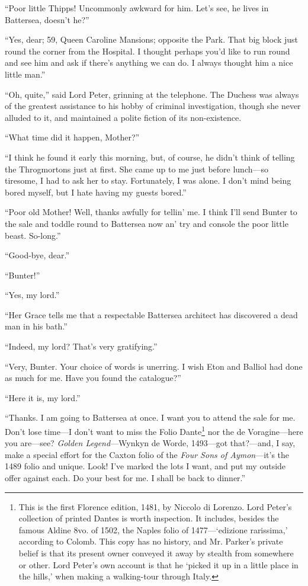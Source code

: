 \enquote{Poor little Thipps! Uncommonly awkward for him. Let’s see, he lives in Battersea, doesn’t he?}

\enquote{Yes, dear; 59, Queen Caroline Mansions; opposite the Park. That big block just round the corner from the Hospital. I thought perhaps you’d like to run round and see him and ask if there’s anything we can do. I always thought him a nice little man.}

\enquote{Oh, quite,} said Lord Peter, grinning at the telephone. The Duchess was always of the greatest assistance to his hobby of criminal investigation, though she never alluded to it, and maintained a polite fiction of its non-existence.

\enquote{What time did it happen, Mother?}

\enquote{I think he found it early this morning, but, of course, he didn’t think of telling the Throgmortons just at first. She came up to me just before lunch\allowbreak---\allowbreak so tiresome, I had to ask her to stay. Fortunately, I was alone. I don’t mind being bored myself, but I hate having my guests bored.}

\enquote{Poor old Mother! Well, thanks awfully for tellin’ me. I think I’ll send Bunter to the sale and toddle round to Battersea now an’ try and console the poor little beast. So-long.}

\enquote{Good-bye, dear.}

\enquote{Bunter!}

\enquote{Yes, my lord.}

\enquote{Her Grace tells me that a respectable Battersea architect has discovered a dead man in his bath.}

\enquote{Indeed, my lord? That’s very gratifying.}

\enquote{Very, Bunter. Your choice of words is unerring. I wish Eton and Balliol had done as much for me. Have you found the catalogue?}

\enquote{Here it is, my lord.}

\enquote{Thanks. I am going to Battersea at once. I want you to attend the sale for me. Don’t lose time\allowbreak---\allowbreak I don’t want to miss the Folio Dante\footnote{This is the first Florence edition, 1481, by Niccolo di Lorenzo. Lord Peter’s collection of printed Dantes is worth inspection. It includes, besides the famous Aldine 8vo. of 1502, the Naples folio of 1477—\enquote{edizione rarissima,} according to Colomb. This copy has no history, and Mr. Parker’s private belief is that its present owner conveyed it away by stealth from somewhere or other. Lord Peter’s own account is that he \enquote{picked it up in a little place in the hills,} when making a walking-tour through Italy.} nor the de Voragine\allowbreak---\allowbreak here you are\allowbreak---\allowbreak see? \textit{Golden Legend}---Wynkyn de Worde, 1493\allowbreak---\allowbreak got that?---and, I say, make a special effort for the Caxton folio of the \textit{Four Sons of Aymon}---it’s the 1489 folio and unique. Look! I’ve marked the lots I want, and put my outside offer against each. Do your best for me. I shall be back to dinner.}

